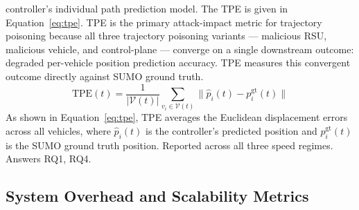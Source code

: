 \documentclass[12pt, a4paper]{report}
\begin{document}
controller's individual path prediction model. The TPE is
given in Equation~\ref{eq:tpe}.
\newline
\newline
TPE is the primary attack-impact metric for trajectory poisoning
because all three trajectory poisoning variants --- malicious
RSU, malicious vehicle, and control-plane --- converge on a
single downstream outcome: degraded per-vehicle position
prediction accuracy. TPE measures this convergent outcome
directly against SUMO ground truth.
\begin{equation}
  \mathrm{TPE}(t) =
    \frac{1}{|\mathcal{V}(t)|}
    \sum_{v_i \in \mathcal{V}(t)}
    \bigl\|\hat{p}_i(t) - p_i^{\mathrm{gt}}(t)\bigr\|
  \label{eq:tpe}
\end{equation}
As shown in Equation~\ref{eq:tpe}, TPE averages the Euclidean
displacement errors across all vehicles, where $\hat{p}_i(t)$
is the controller's predicted position and
$p_i^{\mathrm{gt}}(t)$ is the SUMO ground truth position.
Reported across all three speed regimes. Answers RQ1, RQ4.

\subsection{System Overhead and Scalability Metrics}
\end{document}
